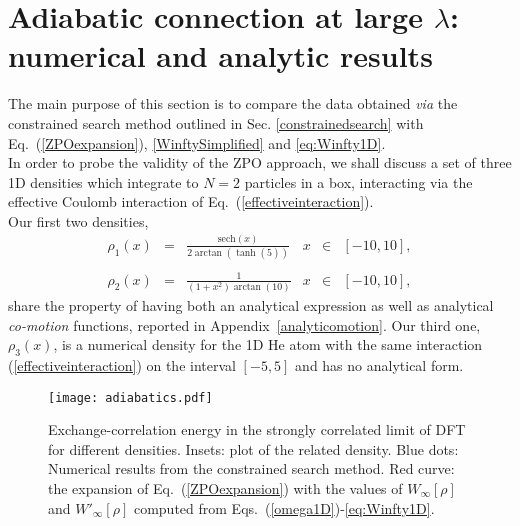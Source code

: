 \documentclass[aps,pra,twocolumn,superscriptaddress]{revtex4}
\begin{document}
\section{Adiabatic connection at large $\lambda$: numerical and analytic results}\label{sec:adiabaticcomparison}
The main purpose of this section is to compare the data obtained \textit{via} the constrained search method outlined in Sec. \ref{constrainedsearch} with Eq.~(\ref{ZPOexpansion}), \eqref{WinftySimplified} and \eqref{eq:Winfty1D}.
 \\In order to probe the validity of the ZPO approach, we shall discuss a set of three 1D densities which integrate to $N=2$ particles in a box, interacting via the effective  Coulomb interaction of Eq.~(\ref{effectiveinteraction}).
\\Our first two densities,
\begin{equation}
	\label{eq:rhoused}
\begin{matrix}
\rho_1(x)&=&\frac{\text{sech}(x)}{2\arctan(\tanh(5))}&x&\in&[-10,10],\\\\\rho_2(x)&=&\frac{1}{(1+x^2)\arctan(10)}&x&\in&[-10,10],
\end{matrix}
\end{equation}  share the property of having both an analytical expression as well as analytical \textit{co-motion} functions, reported in Appendix~\ref{analyticomotion}. Our third one, $\rho_3(x)$, is a numerical density for the 1D He atom with the same interaction (\ref{effectiveinteraction}) on the interval $[-5,5]$ and has no analytical form. 
\begin{figure}
\centering
\texttt{[image: adiabatics.pdf]}
\caption{\label{adiabaticsfigure} Exchange-correlation energy in the strongly correlated limit of DFT for different densities. Insets: plot of the related density. Blue dots: Numerical results from the constrained search method. Red curve: the expansion of Eq.~(\ref{ZPOexpansion}) with the values of $W_\infty[\rho]$ and $W'_\infty[\rho]$ computed from Eqs.~(\ref{omega1D})-\eqref{eq:Winfty1D}.}
\end{figure}
\end{document}
